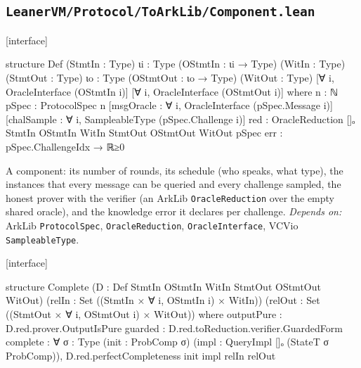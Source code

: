 \subsection{\texttt{LeanerVM/Protocol/ToArkLib/Component.lean}}\label{sec:gen-cat-spine-Component}

\par\medskip\noindent\textbf{}\hfill\textsf{\small [interface]}\par\nopagebreak

\begin{leancode}
structure Def (StmtIn : Type) {ιi : Type} (OStmtIn : ιi → Type) (WitIn : Type)
    (StmtOut : Type) {ιo : Type} (OStmtOut : ιo → Type) (WitOut : Type)
    [∀ i, OracleInterface (OStmtIn i)] [∀ i, OracleInterface (OStmtOut i)] where
  n : ℕ
  pSpec : ProtocolSpec n
  [msgOracle : ∀ i, OracleInterface (pSpec.Message i)]
  [chalSample : ∀ i, SampleableType (pSpec.Challenge i)]
  red : OracleReduction []ₒ StmtIn OStmtIn WitIn StmtOut OStmtOut WitOut pSpec
  err : pSpec.ChallengeIdx → ℝ≥0
\end{leancode}


A component: its number of rounds, its schedule (who speaks, what type), the instances that every message can be queried and every challenge sampled, the honest prover with the verifier (an ArkLib \texttt{OracleReduction} over the empty shared oracle), and the knowledge error it declares per challenge. \emph{Depends on:} ArkLib \texttt{ProtocolSpec}, \texttt{OracleReduction}, \texttt{OracleInterface}, VCVio \texttt{SampleableType}.

\par\medskip\noindent\textbf{}\hfill\textsf{\small [interface]}\par\nopagebreak

\begin{leancode}
structure Complete (D : Def StmtIn OStmtIn WitIn StmtOut OStmtOut WitOut)
    (relIn : Set ((StmtIn × ∀ i, OStmtIn i) × WitIn))
    (relOut : Set ((StmtOut × ∀ i, OStmtOut i) × WitOut)) where
  outputPure : D.red.prover.OutputIsPure
  guarded : D.red.toReduction.verifier.GuardedForm
  complete : ∀ {σ : Type} (init : ProbComp σ) (impl : QueryImpl []ₒ (StateT σ ProbComp)),
    D.red.perfectCompleteness init impl relIn relOut
\end{leancode}



